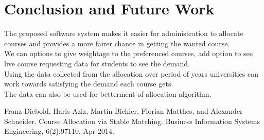 \documentclass[conference]{IEEEtran}
\begin{document}
\section{ \textbf{Conclusion and Future Work} }
The proposed software system makes it easier for administration to allocate courses and 
provides a more fairer chance in getting the wanted course.\\
We can options to give weightage to the preferenced courses, 
add option to see live course requesting data for students to see the demand.\\
Using the data collected from the allocation over period of years universities can work towards satisfying the demand each course gets.\\
The data can also be used for betterment of allocation algorithm.


\begin{thebibliography}{00}
 Franz Diebold, Haris Aziz, Martin Bichler, Florian
Matthes, and Alexander Schneider. Course Allocation
via Stable Matching. Business  Information Systems
Engineering, 6(2):97110, Apr 2014.

\end{thebibliography}
\vspace{12pt}
\end{document}
